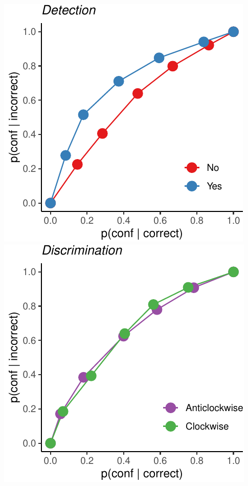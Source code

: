 \documentclass[
]{article}
\begin{document}
\includegraphics{Chudi-Thesis-2020_files/figure-latex/unnamed-chunk-6-1.pdf}
\includegraphics{Chudi-Thesis-2020_files/figure-latex/unnamed-chunk-6-2.pdf}
\end{document}
